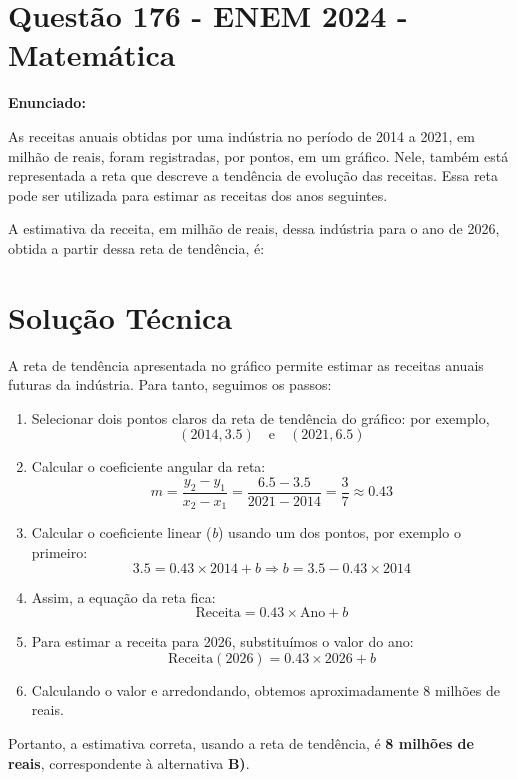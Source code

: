 \documentclass{article}
\begin{document}
\section*{Questão 176 - ENEM 2024 - Matemática}

\textbf{Enunciado:}

As receitas anuais obtidas por uma indústria no período de 2014 a 2021, em milhão de reais, foram registradas, por pontos, em um gráfico. Nele, também está representada a reta que descreve a tendência de evolução das receitas. Essa reta pode ser utilizada para estimar as receitas dos anos seguintes.

A estimativa da receita, em milhão de reais, dessa indústria para o ano de 2026, obtida a partir dessa reta de tendência, é:

\section*{Solução Técnica}

A reta de tendência apresentada no gráfico permite estimar as receitas anuais futuras da indústria. Para tanto, seguimos os passos:
\begin{enumerate}
  \item Selecionar dois pontos claros da reta de tendência do gráfico: por exemplo, 
  \[(2014, 3.5) \quad \text{e} \quad (2021, 6.5)\]
  
  \item Calcular o coeficiente angular da reta:
  \[
m = \frac{y_2 - y_1}{x_2 - x_1} = \frac{6.5 - 3.5}{2021 - 2014} = \frac{3}{7} \approx 0.43
  \]
  
  \item Calcular o coeficiente linear (\textit{b}) usando um dos pontos, por exemplo o primeiro:
  \[
3.5 = 0.43 \times 2014 + b \Rightarrow b = 3.5 - 0.43 \times 2014
  \]

  \item Assim, a equação da reta fica:
  \[
  \text{Receita} = 0.43 \times \text{Ano} + b
  \]

  \item Para estimar a receita para 2026, substituímos o valor do ano:
  \[
  \text{Receita}(2026) = 0.43 \times 2026 + b
  \]

  \item Calculando o valor e arredondando, obtemos aproximadamente 8 milhões de reais.
\end{enumerate}

Portanto, a estimativa correta, usando a reta de tendência, é \textbf{8 milhões de reais}, correspondente à alternativa \textbf{B)}.
\end{document}
